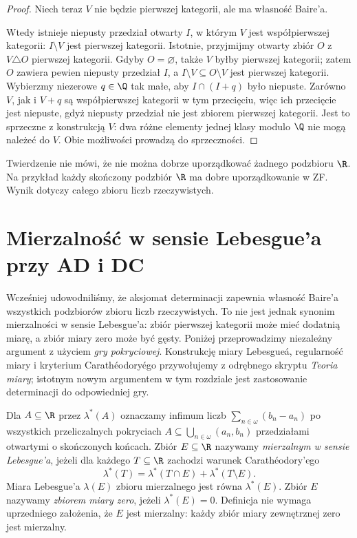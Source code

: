 \begin{proof}
Niech teraz $V$ nie będzie pierwszej kategorii,
ale ma własność Baire'a.

Wtedy istnieje niepusty przedział otwarty $I$,
w którym $V$ jest współpierwszej kategorii:
$I\setminus V$ jest pierwszej kategorii.
Istotnie, przyjmijmy otwarty zbiór $O$
z $V\triangle O$ pierwszej kategorii.
Gdyby $O=\varnothing$, także $V$
byłby pierwszej kategorii; zatem $O$
zawiera pewien niepusty przedział $I$,
a $I\setminus V\subseteq O\setminus V$
jest pierwszej kategorii.
Wybierzmy niezerowe $q\in\Q$
tak małe, aby $I\cap(I+q)$ było niepuste. Zarówno
$V$, jak i $V+q$ są współpierwszej kategorii w tym
przecięciu, więc ich przecięcie jest niepuste, gdyż
niepusty przedział nie jest zbiorem pierwszej kategorii.
Jest to sprzeczne z konstrukcją $V$: dwa różne elementy
jednej klasy modulo $\Q$ nie mogą należeć do $V$.
Obie możliwości prowadzą do sprzeczności.
\end{proof}
\begin{uwaga}
Twierdzenie nie mówi, że nie można dobrze uporządkować
żadnego podzbioru $\R$. Na przykład każdy skończony
podzbiór $\R$ ma dobre uporządkowanie w ZF.
Wynik dotyczy całego zbioru liczb rzeczywistych.
\end{uwaga}


\section{Mierzalność w sensie Lebesgue'a przy AD i DC}
\label{sec:ad-lebesgue-measurability}
Wcześniej udowodniliśmy, że aksjomat determinacji
zapewnia własność Baire'a wszystkich podzbiorów
zbioru liczb rzeczywistych. To nie jest jednak
synonim mierzalności w sensie Lebesgue'a: zbiór
pierwszej kategorii może mieć dodatnią miarę,
a zbiór miary zero może być gęsty.
Poniżej przeprowadzimy niezależny argument
z użyciem \emph{gry pokryciowej}. Konstrukcję miary Lebesgue\'a,
regularność miary i kryterium Carathéodory\'ego przywołujemy
z odrębnego skryptu \emph{Teoria miary}; istotnym nowym
argumentem w tym rozdziale jest zastosowanie determinacji
do odpowiedniej gry.

\begin{definicja}
\label{def:ad-lebesgue}
Dla $A\subseteq\R$ przez $\lambda^*(A)$ oznaczamy
infimum liczb $\sum_{n\in\omega}(b_n-a_n)$
po wszystkich przeliczalnych pokryciach
$A\subseteq\bigcup_{n\in\omega}(a_n,b_n)$
przedziałami otwartymi o skończonych końcach.
Zbiór $E\subseteq\R$ nazywamy \emph{mierzalnym
w sensie Lebesgue'a}, jeżeli dla każdego
$T\subseteq\R$ zachodzi warunek Carathéodory'ego
\[
 \lambda^*(T)=\lambda^*(T\cap E)+\lambda^*(T\setminus E).
\]
Miara Lebesgue'a $\lambda(E)$ zbioru mierzalnego
jest równa $\lambda^*(E)$.
Zbiór $E$ nazywamy \emph{zbiorem miary zero},
jeżeli $\lambda^*(E)=0$. Definicja nie wymaga
uprzedniego założenia, że $E$ jest mierzalny:
każdy zbiór miary zewnętrznej zero jest mierzalny.
\end{definicja}


